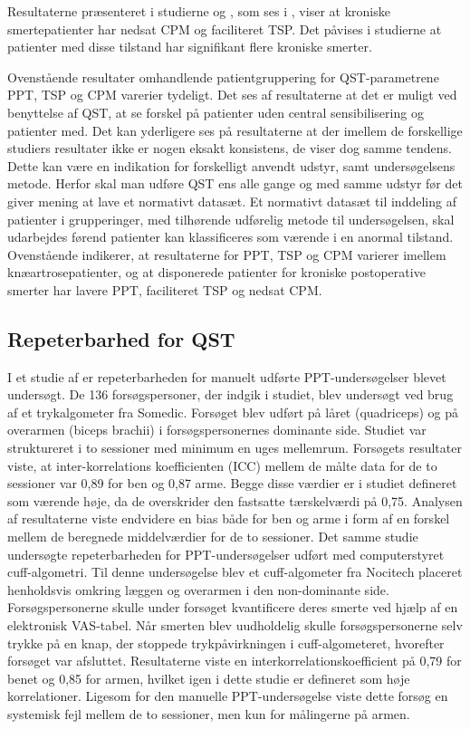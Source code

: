 Resultaterne præsenteret i studierne  og , som ses i , viser at kroniske smertepatienter har nedsat CPM og faciliteret TSP. Det påvises i studierne at patienter med disse tilstand har signifikant flere kroniske smerter. \citep{Vaegter2016} \citep{Petersen2016}

Ovenstående resultater omhandlende patientgruppering for QST-parametrene PPT, TSP og CPM varerier tydeligt. Det ses af resultaterne at det er muligt ved benyttelse af QST, at se forskel på patienter uden central sensibilisering og patienter med. Det kan yderligere ses på resultaterne at der imellem de forskellige studiers resultater ikke er nogen eksakt konsistens, de viser dog samme tendens. Dette kan være en indikation for forskelligt anvendt udstyr, samt undersøgelsens metode. Herfor skal man udføre QST ens alle gange og med samme udstyr før det giver mening at lave et normativt datasæt. Et normativt datasæt til inddeling af patienter i grupperinger, med tilhørende udførelig metode til undersøgelsen, skal udarbejdes førend patienter kan klassificeres som værende i en anormal tilstand. Ovenstående indikerer, at resultaterne for PPT, TSP og CPM varierer imellem knæartrosepatienter, og at disponerede patienter for kroniske postoperative smerter har lavere PPT, faciliteret TSP og nedsat CPM. 

\subsection{Repeterbarhed for QST}
I et studie af  er repeterbarheden for manuelt udførte PPT-undersøgelser blevet undersøgt. De 136 forsøgspersoner, der indgik i studiet, blev undersøgt ved brug af et trykalgometer fra Somedic. Forsøget blev udført på låret (quadriceps) og på overarmen (biceps brachii) i forsøgspersonernes dominante side. Studiet var struktureret i to sessioner med minimum en uges mellemrum. Forsøgets resultater viste, at inter-korrelations koefficienten (ICC) mellem de målte data for de to sessioner var 0,89 for ben og 0,87 arme. Begge disse værdier er i studiet defineret som værende høje, da de overskrider den fastsatte tærskelværdi på 0,75. Analysen af resultaterne viste endvidere en bias både for ben og arme i form af en forskel mellem de beregnede middelværdier for de to sessioner. Det samme studie undersøgte repeterbarheden for PPT-undersøgelser udført med computerstyret cuff-algometri. Til denne undersøgelse blev et cuff-algometer fra Nocitech placeret henholdsvis omkring læggen og overarmen i den non-dominante side. Forsøgspersonerne skulle under forsøget kvantificere deres smerte ved hjælp af en elektronisk VAS-tabel. Når smerten blev uudholdelig skulle forsøgspersonerne selv trykke på en knap, der stoppede trykpåvirkningen i cuff-algometeret, hvorefter forsøget var afsluttet. Resultaterne viste en interkorrelationskoefficient på 0,79 for benet og 0,85 for armen, hvilket igen i dette studie er defineret som høje korrelationer. Ligesom for den manuelle PPT-undersøgelse viste dette forsøg en systemisk fejl mellem de to sessioner, men kun for målingerne på armen.

